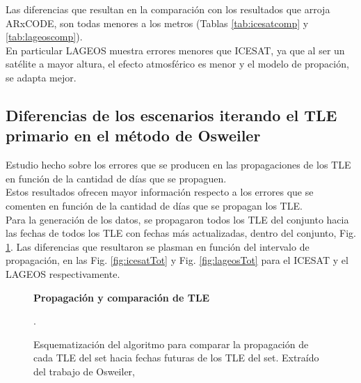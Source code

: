 Las diferencias que resultan en la comparaci\'on con los resultados que arroja ARxCODE, son todas menores a los metros (Tablas \ref{tab:icesatcomp} y \ref{tab:lageoscomp}).\\
En particular LAGEOS muestra errores menores que ICESAT, ya que al ser un sat\'elite a mayor altura, el efecto atmosf\'erico es menor y el modelo de propaci\'on, se adapta mejor.\\


\subsection*{Diferencias de los escenarios iterando el TLE primario en el m\'etodo de Osweiler}
Estudio hecho sobre los errores que se producen en las propagaciones de los TLE en funci\'on de la cantidad de d\'ias que se propaguen.\\
Estos resultados ofrecen mayor informaci\'on respecto a los errores que se comenten en funci\'on de la cantidad de d\'ias que se propagan los TLE.\\
Para la generaci\'on de los datos, se propagaron todos los TLE del conjunto hacia las fechas de todos los TLE con fechas m\'as actualizadas, dentro del conjunto, Fig. \ref{fig:todosOSW}. Las diferencias que resultaron se plasman en funci\'on del intervalo de propagaci\'on, en las Fig. \ref{fig:icesatTot} y Fig. \ref{fig:lageosTot} para el ICESAT y el LAGEOS respectivamente. 


\begin{figure}[!h]
\centering
  \textbf{Propagaci\'on y comparaci\'on de TLE }\par\medskip
  \caption{Esquematizaci\'on del algoritmo para comparar la propagaci\'on de cada TLE del set hacia fechas futuras de los TLE del set. Extra\'ido del trabajo de Osweiler, \citep{osweiler}}.
  \label{fig:todosOSW}
\end{figure}

